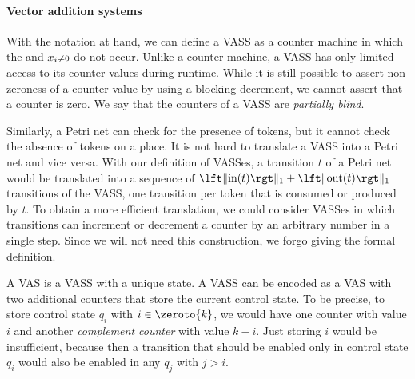 \documentclass[../../diss.tex]{subfiles}
\begin{document}
\paragraph{Vector addition systems}

With the notation at hand, we can define a VASS as a counter machine in which the  and $x_i{\scriptstyle\neq0}$ do not occur.
Unlike a counter machine, a VASS has only limited access to its counter values during runtime.
While it is still possible to assert non-zeroness of a counter value by using a blocking decrement, we cannot assert that a counter is zero.
We say that the counters of a VASS are \emph{partially blind}.

Similarly, a Petri net can check for the presence of tokens, but it cannot check the absence of tokens on a place.
It is not hard to translate a VASS into a Petri net and vice versa.
With our definition of VASSes, a transition $t$ of a Petri net would be translated into a sequence of $\normone{\i(t)} + \normone{\o(t)}$ transitions of the VASS, one transition per token that is consumed or produced by $t$.
To obtain a more efficient translation, we could consider VASSes in which transitions can increment or decrement a counter by an arbitrary number in a single step.
Since we will not need this construction, we forgo giving the formal definition.

A VAS is a VASS with a unique state.
A VASS can be encoded as a VAS with two additional counters that store the current control state.
To be precise, to store control state $q_i$ with $i \in \zeroto{k}$, we would have one counter with value $i$ and another \emph{complement counter} with value $k-i$.
Just storing $i$ would be insufficient, because then a transition that should be enabled only in control state $q_i$ would also be enabled in any $q_j$ with $j > i$.
\end{document}
